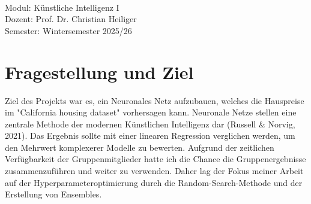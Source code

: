 \documentclass[9pt,a4paper,twocolumn,twoside]{tau-class/tau}
\begin{document}
\begin{titlepage}
\begin{minipage}{0.5\textwidth}
\begin{flushright}
        \end{flushright}
    \end{minipage}\\[2.0 cm]

        
    \begin{minipage}{0.8\textwidth}
       \begin{center}
        \large
        Modul: Künstliche Intelligenz I\\
        Dozent: Prof. Dr. Christian Heiliger\\
        Semester: Wintersemester 2025/26
        \end{center} 
    \end{minipage}

\vfill



\end{titlepage}

\clearpage
{} %

\tableofcontents

\clearpage
{}
{}



\maketitle
\thispagestyle{firststyle}

\section{Fragestellung und Ziel}
Ziel des Projekts war es, ein Neuronales Netz aufzubauen, welches die Hauspreise im "California housing dataset" vorhersagen kann. 
Neuronale Netze stellen eine zentrale Methode der modernen Künstlichen Intelligenz dar (Russell \& Norvig, 2021).
Das Ergebnis sollte mit einer linearen Regression verglichen werden, um den Mehrwert komplexerer Modelle zu bewerten.
Aufgrund der zeitlichen Verfügbarkeit der Gruppenmitglieder hatte ich die Chance die Gruppenergebnisse zusammenzuführen und weiter
zu verwenden. Daher lag der Fokus meiner Arbeit auf der Hyperparameteroptimierung durch die Random-Search-Methode und der Erstellung von Ensembles.
\end{document}
